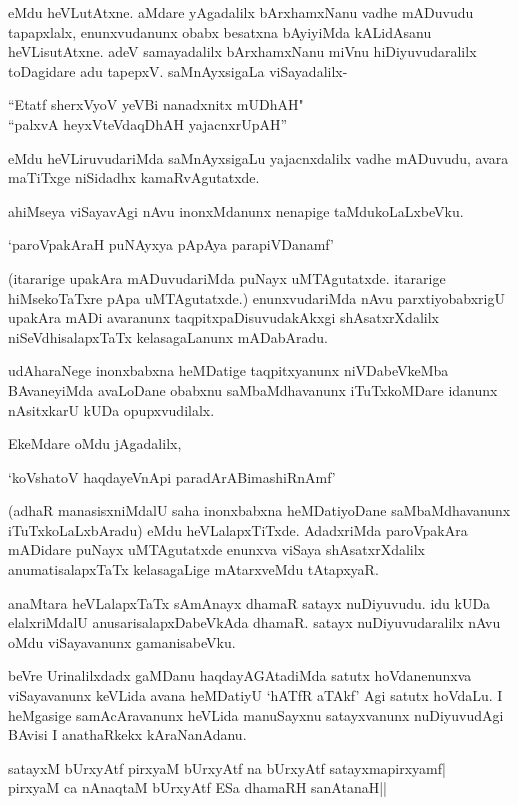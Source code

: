 \noindent eMdu heVLutAtxne. aMdare yAgadalilx bArxhamxNanu vadhe mADuvudu tapapxlalx, enunxvudanunx obabx besatxna bAyiyiMda kALidAsanu heVLisutAtxne. adeV samayadalilx bArxhamxNanu miVnu hiDiyuvudaralilx toDagidare adu tapepxV. saMnAyxsigaLa viSayadalilx-

\begin{shloka}
``Etatf sherxVyoV yeVBi nanadxnitx mUDhAH"\\
``palxvA heyxVteV\s daqDhAH yajacnxrUpAH''
\end{shloka}

\noindent eMdu heVLiruvudariMda saMnAyxsigaLu yajacnxdalilx vadhe mADuvudu, avara maTiTxge niSidadhx kamaRvAgutatxde.

ahiMseya viSayavAgi nAvu inonxMdanunx nenapige taMdukoLaLxbeVku.

\begin{shloka}
`paroVpakAraH puNAyxya pApAya parapiVDanamf'
\end{shloka}

(itararige upakAra mADuvudariMda puNayx uMTAgutatxde. itararige hiMsekoTaTxre pApa uMTAgutatxde.) enunxvudariMda nAvu parxtiyobabxrigU upakAra mADi avaranunx taqpitxpaDisuvudakAkxgi shAsatxrXdalilx niSeVdhisalapxTaTx kelasagaLanunx mADabAradu.

udAharaNege inonxbabxna heMDatige taqpitxyanunx niVDabeVkeMba BAvaneyiMda avaLoDane obabxnu saMbaMdhavanunx iTuTxkoMDare idanunx nAsitxkarU kUDa opupxvudilalx.

EkeMdare oMdu jAgadalilx,

\begin{shloka}
`koVshatoV haqdayeVnApi paradArABimashiRnAmf'
\end{shloka}

(adhaR manasisxniMdalU saha inonxbabxna heMDatiyoDane saMbaMdhavanunx iTuTxkoLaLxbAradu) eMdu heVLalapxTiTxde. AdadxriMda paroVpakAra mADidare puNayx uMTAgutatxde enunxva viSaya shAsatxrXdalilx anumatisalapxTaTx kelasagaLige mAtarxveMdu tAtapxyaR.

anaMtara heVLalapxTaTx sAmAnayx dhamaR satayx nuDiyuvudu. idu kUDa elalxriMdalU anusarisalapxDabeVkAda dhamaR. satayx nuDiyuvudaralilx nAvu oMdu viSayavanunx gamanisabeVku.

beVre Urinalilxdadx gaMDanu haqdayAGAtadiMda satutx hoVdanenunxva viSayavanunx keVLida avana heMDatiyU `hATfR aTAkf' Agi satutx hoVdaLu. I heMgasige samAcAravanunx heVLida manuSayxnu satayxvanunx nuDiyuvudAgi BAvisi I anathaRkekx kAraNanAdanu.

\begin{shloka}
satayxM bUrxyAtf pirxyaM bUrxyAtf na bUrxyAtf satayxmapirxyamf|\\
pirxyaM ca nAnaqtaM bUrxyAtf ESa dhamaRH sanAtanaH||
\end{shloka}

